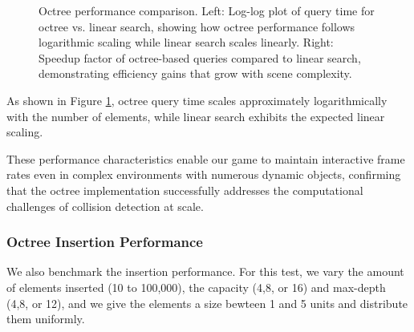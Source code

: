 \documentclass{article}
\begin{document}
\begin{figure}[H]
\begin{minipage}{0.49\textwidth}
    \end{minipage}
    \caption{Octree performance comparison. Left: Log-log plot of query time for octree vs. linear search, showing how octree performance follows logarithmic scaling while linear search scales linearly. Right: Speedup factor of octree-based queries compared to linear search, demonstrating efficiency gains that grow with scene complexity.}
    \label{fig:octree-performance}
\end{figure}

As shown in Figure \ref{fig:octree-performance}, octree query time scales
approximately logarithmically with the number of elements, while linear search
exhibits the expected linear scaling.


These performance characteristics enable our game to maintain interactive frame
rates even in complex environments with numerous dynamic objects, confirming
that the octree implementation successfully addresses the computational
challenges of collision detection at scale.

\subsubsection{Octree Insertion Performance}

We also benchmark the insertion performance. For this test, we vary the amount
of elements inserted (10 to 100,000), the capacity (4,8, or 16) and max-depth
(4,8, or 12), and we give the elements a size bewteen 1 and 5 units and
distribute them uniformly.
\end{document}
